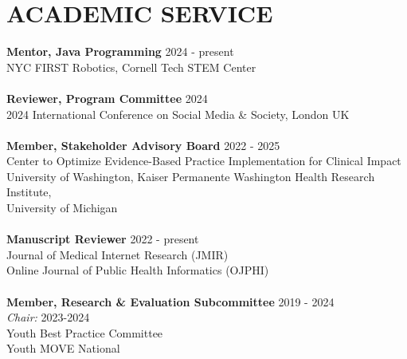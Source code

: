 \documentclass[a4paper,12pt]{article}
\begin{document}
{\section*{ACADEMIC SERVICE}
\textbf{Mentor, Java Programming} \hfill 2024 - present\\
NYC FIRST Robotics, Cornell Tech STEM Center\\
\\
\textbf{Reviewer, Program Committee} \hfill 2024\\
2024 International Conference on Social Media \& Society, London UK\\
\\
\textbf{Member, Stakeholder Advisory Board} \hfill 2022 - 2025\\
Center to Optimize Evidence-Based Practice Implementation for Clinical Impact\\
University of Washington, Kaiser Permanente Washington Health Research Institute, \\University of Michigan\\
\\
\textbf{Manuscript Reviewer} \hfill 2022 - present\\
Journal of Medical Internet Research (JMIR)\\
Online Journal of Public Health Informatics (OJPHI)\\
\\
\textbf{Member, Research \& Evaluation Subcommittee} \hfill 2019 - 2024\\
\textit{Chair:} 2023-2024\\
Youth Best Practice Committee\\
Youth MOVE National\\

}
\end{document}

